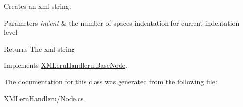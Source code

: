 Creates an xml string. 


\begin{DoxyParams}{Parameters}
{\em indent} & the number of spaces indentation for current indentation level \\
\hline
\end{DoxyParams}
\begin{DoxyReturn}{Returns}
The xml string 
\end{DoxyReturn}


Implements \hyperlink{class_x_m_leru_handleru_1_1_base_node}{X\+M\+Leru\+Handleru.\+Base\+Node}.



The documentation for this class was generated from the following file\+:\begin{DoxyCompactItemize}
\item 
X\+M\+Leru\+Handleru/Node.\+cs\end{DoxyCompactItemize}
